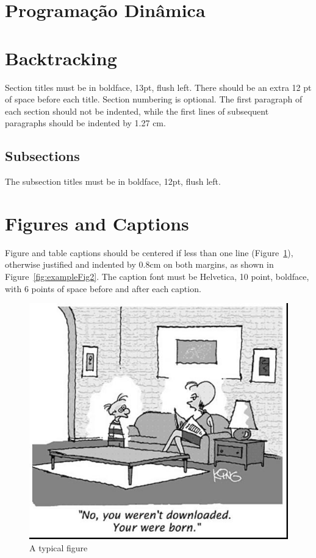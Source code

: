 \documentclass[12pt]{article}
\begin{document}
\section{Programação Dinâmica}


\section{Backtracking}

Section titles must be in boldface, 13pt, flush left. There should be an extra
12 pt of space before each title. Section numbering is optional. The first
paragraph of each section should not be indented, while the first lines of
subsequent paragraphs should be indented by 1.27 cm.

\subsection{Subsections}

The subsection titles must be in boldface, 12pt, flush left.

\section{Figures and Captions}\label{sec:figs}


Figure and table captions should be centered if less than one line
(Figure~\ref{fig:exampleFig1}), otherwise justified and indented by 0.8cm on
both margins, as shown in Figure~\ref{fig:exampleFig2}. The caption font must
be Helvetica, 10 point, boldface, with 6 points of space before and after each
caption.

\begin{figure}[ht]
\centering
\includegraphics[width=.5\textwidth]{fig1.jpg}
\caption{A typical figure}
\label{fig:exampleFig1}
\end{figure}
\end{document}
